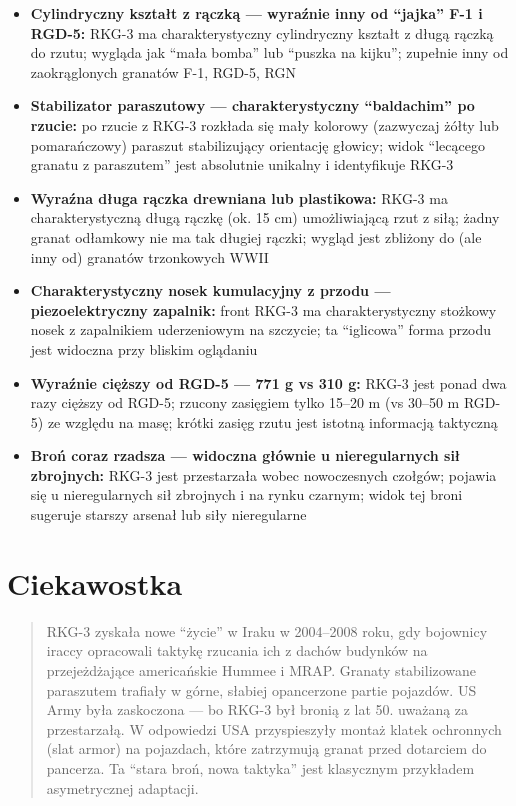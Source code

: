 \documentclass[12pt,openany,oneside]{book}
\providecommand{\tightlist}{%
  \setlength{\itemsep}{0pt}\setlength{\parskip}{0pt}}
\begin{document}
\begin{itemize}
\tightlist
\item
  \textbf{Cylindryczny kształt z rączką --- wyraźnie inny od ``jajka''
  F-1 i RGD-5:} RKG-3 ma charakterystyczny cylindryczny kształt z długą
  rączką do rzutu; wygląda jak ``mała bomba'' lub ``puszka na kijku'';
  zupełnie inny od zaokrąglonych granatów F-1, RGD-5, RGN
\item
  \textbf{Stabilizator paraszutowy --- charakterystyczny ``baldachim''
  po rzucie:} po rzucie z RKG-3 rozkłada się mały kolorowy (zazwyczaj
  żółty lub pomarańczowy) paraszut stabilizujący orientację głowicy;
  widok ``lecącego granatu z paraszutem'' jest absolutnie unikalny i
  identyfikuje RKG-3
\item
  \textbf{Wyraźna długa rączka drewniana lub plastikowa:} RKG-3 ma
  charakterystyczną długą rączkę (ok. 15 cm) umożliwiającą rzut z siłą;
  żadny granat odłamkowy nie ma tak długiej rączki; wygląd jest zbliżony
  do (ale inny od) granatów trzonkowych WWII
\item
  \textbf{Charakterystyczny nosek kumulacyjny z przodu ---
  piezoelektryczny zapalnik:} front RKG-3 ma charakterystyczny stożkowy
  nosek z zapalnikiem uderzeniowym na szczycie; ta ``iglicowa'' forma
  przodu jest widoczna przy bliskim oglądaniu
\item
  \textbf{Wyraźnie cięższy od RGD-5 --- 771 g vs 310 g:} RKG-3 jest
  ponad dwa razy cięższy od RGD-5; rzucony zasięgiem tylko 15--20 m (vs
  30--50 m RGD-5) ze względu na masę; krótki zasięg rzutu jest istotną
  informacją taktyczną
\item
  \textbf{Broń coraz rzadsza --- widoczna głównie u nieregularnych sił
  zbrojnych:} RKG-3 jest przestarzała wobec nowoczesnych czołgów;
  pojawia się u nieregularnych sił zbrojnych i na rynku czarnym; widok
  tej broni sugeruje starszy arsenał lub siły nieregularne
\end{itemize}

\section{Ciekawostka}\label{ciekawostka-105}

\begin{quote}
RKG-3 zyskała nowe ``życie'' w Iraku w 2004--2008 roku, gdy bojownicy
iraccy opracowali taktykę rzucania ich z dachów budynków na
przejeżdżające americańskie Hummee i MRAP. Granaty stabilizowane
paraszutem trafiały w górne, słabiej opancerzone partie pojazdów. US
Army była zaskoczona --- bo RKG-3 był bronią z lat 50. uważaną za
przestarzałą. W odpowiedzi USA przyspieszyły montaż klatek ochronnych
(slat armor) na pojazdach, które zatrzymują granat przed dotarciem do
pancerza. Ta ``stara broń, nowa taktyka'' jest klasycznym przykładem
asymetrycznej adaptacji.
\end{quote}
\end{document}
